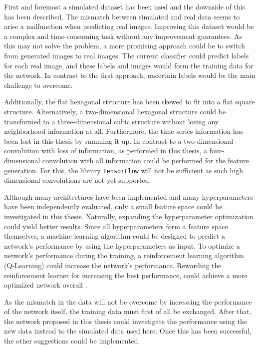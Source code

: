 First and foremost a simulated dataset has been used and the downside of this has been described.
The mismatch between simulated and real data seems to arise a malfunction when predicting real images.
Improving this dataset would be a complex and time-consuming task without any improvement guarantees.
As this may not solve the problem,
a more promising approach could be to switch from generated images to real images.
The current classifier could predict labels for each real image, and these labels
and images would form the training data for the network.
In contrast to the first approach, uncertain labels would be the main challenge to overcome.

Additionally, the flat hexagonal structure has been skewed to fit into a flat square structure.
Alternatively, a two-dimensional hexagonal structure could be transformed to a three-dimensional cubic structure
without losing any neighborhood information at all.
Furthermore, the time series information has been lost in this thesis by summing it up.
In contrast to a two-dimensional convolution with loss of information, as performed in this thesis,
a four-dimensional convolution with all information could be performed for the feature generation.
For this, the library \texttt{TensorFlow} will not be sufficient as such high dimensional convolutions are not yet supported.

Although many architectures have been implemented and many hyperparameters have been independently evaluated,
only a small feature space could be investigated in this thesis.
Naturally, expanding the hyperparameter optimization could yield better results.
Since all hyperparameters form a feature space themselves, a machine learning algorithm could be designed to predict
a network's performance by using the hyperparameters as input.
To optimize a network's performance during the training,
a reinforcement learning algorithm (Q-Learning) could increase the network's performance.
Rewarding the reinforcement learner for increasing the best performance,
could achieve a more optimized network overall \cite{q_learning}.

As the mismatch in the data will not be overcome by increasing the performance of the network itself,
the training data must first of all be exchanged.
After that, the network proposed in this thesis could investigate the performance using the new data
instead to the simulated data used here.
Once this has been successful, the other suggestions could be implemented.


